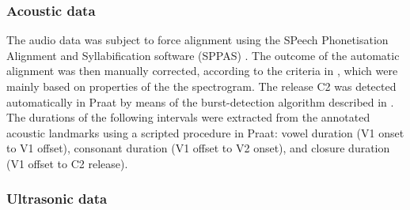 \documentclass[]{article}
\begin{document}
\hypertarget{acoustic-data}{%
\subsubsection{Acoustic data}\label{acoustic-data}}

The audio data was subject to force alignment using the SPeech
Phonetisation Alignment and Syllabification software (SPPAS)
\citep{bigi2015}. The outcome of the automatic alignment was then
manually corrected, according to the criteria in ,
which were mainly based on properties of the the spectrogram. The
release C2 was detected automatically in Praat \citep{boersma2016} by
means of the burst-detection algorithm described in
\citet{ananthapadmanabha2014}. The durations of the following intervals
were extracted from the annotated acoustic landmarks using a scripted
procedure in Praat: vowel duration (V1 onset to V1 offset), consonant
duration (V1 offset to V2 onset), and closure duration (V1 offset to C2
release).


\hypertarget{ultrasonic-data}{%
\subsubsection{Ultrasonic data}\label{ultrasonic-data}}
\end{document}
